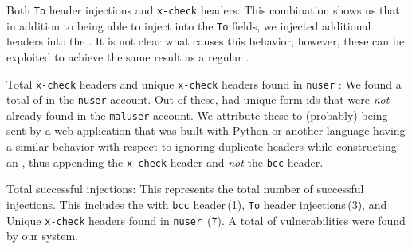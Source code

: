 Both \lstinline{To} header injections and \lstinline{x-check} headers: This
combination shows us that in addition to being able to inject into the
\lstinline{To} fields, we injected additional headers into the \email. It
is not clear what causes this behavior; however, these can be
exploited to achieve the same result as a regular \ehi.
	
Total \lstinline{x-check} headers and unique \lstinline{x-check} headers
found in \lstinline{nuser} \emails: We found a total of \ehinuserxcheck
\emails in the \lstinline{nuser} account. Out of these,
\ehiuniquenuserxcheck had unique form ids that were \emph{not} already
found in the \lstinline{maluser} account. We attribute these \emails to
(probably) being sent by a web application that was built with Python
or another language having a similar behavior with respect to ignoring
duplicate headers while constructing an \email, thus appending the
\lstinline{x-check} header and \emph{not} the \lstinline{bcc} header.
	
Total successful injections: This represents the total number of
successful injections. This includes the \ehi with \lstinline{bcc}
header\,(1), \lstinline{To} header injections\,(3), and Unique
\lstinline{x-check} headers found in \lstinline{nuser} \emails\,(7). A total
of \success vulnerabilities were found by our system.

